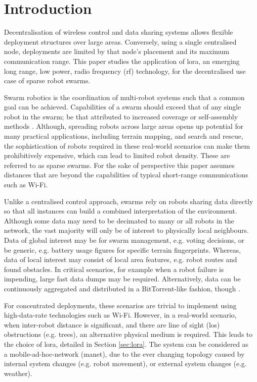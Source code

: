 \chapter{Introduction}
Decentralisation of wireless control and data sharing systems allows flexible deployment structures over large areas. Conversely, using a single centralised node, deployments are limited by that node's placement and its maximum communication range. This paper studies the application of \ac{lora}, an emerging long range, low power, radio frequency (\ac{rf}) technology, for the decentralised use case of sparse robot swarms. 
  
Swarm robotics is the coordination of multi-robot systems such that a common goal can be achieved. Capabilities of a swarm should exceed that of any single robot in the swarm; be that attributed to increased coverage \cite{Ducatelle:2011:Pathfinding} or self-assembly methods \cite{3YP:OBSTACLE_SWARMS}. 
 Although, spreading robots across large areas opens up potential for many practical applications, including terrain mapping, and search and rescue, the sophistication of robots required in these real-world scenarios can make them prohibitively expensive, which can lead to limited robot density. These are referred to as sparse swarms. For the sake of perspective this paper assumes distances that are beyond the capabilities of typical short-range communications such as Wi-Fi.
 
Unlike a centralised control approach, swarms rely on robots sharing data directly so that all instances can build a combined interpretation of the environment. Although some data may need to be decimated to many or all robots in the network, the vast majority will only be of interest to physically local neighbours. Data of global interest may be for swarm management, e.g. voting decisions, or be generic, e.g. battery usage figures for specific terrain fingerprints. Whereas, data of local interest may consist of local area features, e.g. robot routes and found obstacles. In critical scenarios, for example when a robot failure is impending, large fast data dumps may be required. Alternatively, data can be continuously aggregated and distributed in a BitTorrent-like fashion, though \cite{3YP:SOUL}.

For concentrated deployments, these scenarios are trivial to implement using high-data-rate technologies such as Wi-Fi. However, in a real-world scenario, when inter-robot distance is significant, and there are line of sight (\ac{los}) obstructions (e.g. trees), an alternative physical medium is required. This leads to the choice of \ac{lora}, detailed in Section \ref{sec:lora}. The system can be considered as a mobile-ad-hoc-network (\ac{manet}), due to the ever changing topology caused by internal system changes (e.g. robot movement), or external system changes (e.g. weather).

